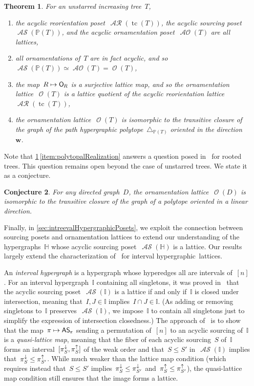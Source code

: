 \documentclass{amsart}
\newtheorem{theorem}{Theorem}[section]
\newtheorem{conjecture}[theorem]{Conjecture}
\theoremstyle{definition}
\renewcommand{\b}[1]{\boldsymbol{#1}} %
\renewcommand{\c}[1]{\mathcal{#1}} %
\newcommand{\simplex}{\triangle} %
\DeclareMathOperator{\tc}{tc} %
\newcommand{\darkblue}{\color{darkblue}} %
\newcommand{\defn}[1]{\textsl{\darkblue #1}} %
\newcommand{\projDown}[1]{\smash{\pi^\downarrow_{#1}}} %
\newcommand{\projUp}[1]{\smash{\pi^\uparrow_{#1}}} %
\newcommand{\mymap}[2]{\mathsf{#1}_{\hspace{-.7pt}#2}}
\DeclareMathOperator{\Orn}{\c{O}}  %
\newcommand{\orn}[1]{\mymap{O}{#1}}  %
\DeclareMathOperator{\AOrn}{\c{AO}}  %
\DeclareMathOperator{\AReori}{\c{AR}}  %
\DeclareMathOperator{\ASour}{\mathcal{AS}}  %
\newcommand{\asour}[1]{\mymap{AS}{#1}}  %
\newcommand{\HH}{\mathbb H}  %
\newcommand{\II}{\mathbb I} %
\newcommand{\PP}{\mathbb P} %
\begin{document}
\pagebreak
\begin{theorem}
\label{thm:main2}
For an unstarred increasing tree~$T$,
\begin{enumerate}
\item the acyclic reorientation poset~$\AReori(\tc(T))$, the acyclic sourcing poset~$\ASour(\PP(T))$, and the acyclic ornamentation poset~$\AOrn(T)$ are all lattices,
\item all ornamentations of~$T$ are in fact acyclic, and so~$\ASour(\PP(T)) \simeq \AOrn(T) = \Orn(T)$,
\item the map~$R \mapsto \orn{R}$ is a surjective lattice map, and so the ornamentation lattice~$\Orn(T)$ is a lattice quotient of the acyclic reorientation lattice~$\AReori(\tc(T))$,
\item the ornamentation lattice~$\Orn(T)$ is isomorphic to the transitive closure of the graph of the path hypergraphic polytope~$\simplex_{\PP(T)}$ oriented in the direction~$\b{w}$. \label{item:polytopalRealization}
\end{enumerate}
\end{theorem}

Note that \cref{thm:main2}\,\eqref{item:polytopalRealization} answers a question posed in~\cite{DefantSack} for rooted trees.
This question remains open beyond the case of unstarred trees.
We state it as a conjecture.

\begin{conjecture}
For any directed graph~$D$, the ornamentation lattice~$\Orn(D)$ is isomorphic to the transitive closure of the graph of a polytope oriented in a linear direction.
\end{conjecture}

Finally, in \cref{sec:intreevalHypergraphicPosets}, we exploit the connection between sourcing posets and ornamentation lattices to extend our understanding of the hypergraphs~$\HH$ whose acyclic sourcing poset~$\ASour(\HH)$ is a lattice.
Our results largely extend the characterization of~\cite{BergeronPilaud} for interval hypergraphic~lattices.

An \defn{interval hypergraph} is a hypergraph whose hyperedges all are intervals of~$[n]$.
For an interval hypergraph~$\II$ containing all singletons, it was proved in~\cite[Thm.~A]{BergeronPilaud} that the acyclic sourcing poset~$\ASour(\II)$ is a lattice if and only if~$\II$ is closed under intersection, meaning that~$I,J \in \II$ implies~$I \cap J \in \II$.
(As adding or removing singletons to~$\II$ preserves~$\ASour(\II)$, we impose~$\II$ to contain all singletons just to simplify the expression of intersection closedness.)
The approach of~\cite{BergeronPilaud} is to show that the map~$\pi \mapsto \asour{\pi}$ sending a permutation of~$[n]$ to an acyclic sourcing of~$\II$ is a \defn{quasi-lattice map}, meaning that the fiber of each acyclic sourcing~$S$ of~$\II$ forms an interval~$[\projDown{S}, \projUp{S}]$ of the weak order and that~$S \le S'$ in~$\ASour(\II)$ implies that~$\projDown{S} \le \projUp{S'}$.
While much weaker than the lattice map condition (which requires instead that~$S \le S'$ implies~$\projDown{S} \le \projDown{S'}$ and~$\projUp{S} \le \projUp{S'}$), the quasi-lattice map condition still ensures that the image forms a lattice.
\end{document}

